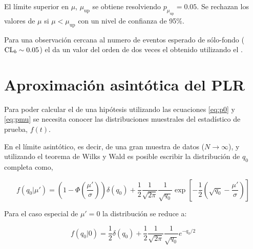 El límite superior {\cls} en $\mu$, $\mu_\text{up}$ se obtiene resolviendo
$p_{\mu_\text{up}} = 0.05$. Se rechazan los valores de $\mu$ si $\mu <
\mu_\text{up}$ con un nivel de confianza de 95\%.

Para una observación cercana al numero de eventos esperado de sólo-fondo ($\text{CL}_b
\sim 0.05$) el {\cls} da un valor del orden de dos veces el obtenido utilizando
el {\clsb}.


\section{Aproximación asintótica del PLR}\label{sec:aprox}

Para poder calcular el {\pvalue} de una hipótesis utilizando las ecuaciones
\eqref{eq:p0} y \eqref{eq:pmu} se necesita conocer las distribuciones muestrales
del estadístico de prueba, $f(t)$.



En el límite asintótico, es decir, de una gran muestra de datos ($N\to\infty$)\cite{AsymAprox}, y
utilizando el teorema de Wilks\cite{WilksTheo} y Wald\cite{WaldTheo} es posible
escribir la distribución de $q_0$ completa como,

\begin{equation}
  f(q_0|\mu') = \left( 1 - \Phi\left(\frac{\mu'}{\sigma}\right)\right)
  \delta(q_0) + \frac{1}{2}\frac{1}{\sqrt{2\pi}}\frac{1}{\sqrt{q_0}} \exp \left[
    -\frac{1}{2} \left( \sqrt{q_0} - \frac{\mu'}{\sigma} \right)\right]
\end{equation}

Para el caso especial de $\mu' = 0$ la distribución se reduce a:

\begin{equation}
  f(q_0|0) = \frac{1}{2} \delta(q_0) +
  \frac{1}{2}\frac{1}{\sqrt{2\pi}}\frac{1}{\sqrt{q_0}} e^{-q_0/2}
\end{equation}

